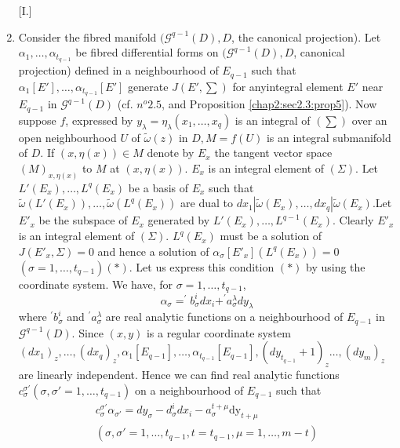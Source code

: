 \begin{enumerate} [I.]
\item Consider the fibred manifold $(\mathscr{G}^{q-1} (D),  D$,  the
  canonical projection). Let $\alpha_1,  \ldots ,  \alpha_{t_{q-1}}$
  be fibred differential forms on $(\mathscr{G}^{q-1} (D),  D$,
  canonical projection) defined in a neighbourhood of $E_{q-1}$ such
  that $\alpha_1 [E'] ,  \ldots ,  \alpha_{t_{q-1}}[E']$ generate $J
  (E' ,  \sum)$ for  any\pageoriginale integral element $E'$ near $E_{ q -1}$ in
  $\mathscr{G}^{q-1}(D)$ (cf. $n^o 2.5$, and Proposition
  \ref{chap2:sec2.3:prop5}). Now
  suppose $f$, expressed by $y_ \lambda = \eta_\lambda (x_1, \ldots ,
  x_q)$ is an integral of $( \sum )$ over an open neighbourhood $U$ of
  $\tilde{\omega}(z)$ in $D, M = f(U)$ is an integral submanifold of
  $D$. If $(x, \eta (x))\in M$ denote by $E_x$ the tangent vector
  space $(M)_{x, \eta (x)}$ to $M$ at $(x, \eta (x))$. $E_x$ is an
  integral element of $( \Sigma)$. Let $L' (E_x) , \ldots , L^q(E_x)$
  be a basis of $E_x$ such that $\tilde{\omega} (L' (E_x)) , \ldots ,
  \tilde{\omega}(L^q(E_x))$ are dual to $dx_1 | \tilde{\omega} (E_x),
  \ldots , dx_q | \tilde{\omega}( E_x)$.\break Let $E'_x$ be the subspace of
  $E_x$ generated by $L' (E_x), \ldots , L^{q-1}(E_x)$. Clearly $E'_x$ is
  an integral element of $( \Sigma )$. $L^q(E_x)$ must be a solution
  of $J(E'_x, \Sigma) =0$ and hence a solution of $\alpha_\sigma[E'_x]
  (L^q(E_x))=0$ $(\sigma =1, \ldots , t_{q-1}) (*)$. Let us express this
  condition $(*)$ by using the coordinate system. We have, for
  $\sigma=1, \ldots , t_{q-1}$, 
  $$
  \alpha_ \sigma = ^{'} b^i_{\sigma} {dx_i} +  ^{'} a^\lambda_\sigma dy_\lambda
  $$   
  where $^{'}b^i_\sigma$ and $^{'}a^\lambda_\sigma$ are real analytic
  functions on a neighbourhood of $E_{q-1}$ in
  $\mathscr{G}^{q-1}(D)$. Since $(x, y)$ is a regular coordinate
  system $(dx_1)_z , \ldots , (dx_q) _z, \alpha_1 [E_{q-1}] , \dots ,
  \alpha_{t_{q-1}} [E_{q-1}], (dy_{t_{q-1}}+1)_z \ldots , (dy_m)_z$
  are linearly independent. Hence we can find real analytic functions
  $c^{\sigma'}_\sigma ( \sigma, \sigma' = 1, \ldots , t_{q-1})$ on a
  neighbourhood of $E_{q-1}$ such that  
  \begin{multline*}
    c^{\sigma'}_\sigma \alpha_{\sigma'} = dy_\sigma - d^i_\sigma dx_i
    - a^{t+\mu}_\sigma \text{dy}_{t + \mu}\\ 
    (\sigma, \sigma' =1 , \ldots , t_{q-1}, t=t_{q-1}, \mu= 1 , \ldots , m-t)
  \end{multline*}
  

\end{enumerate}

